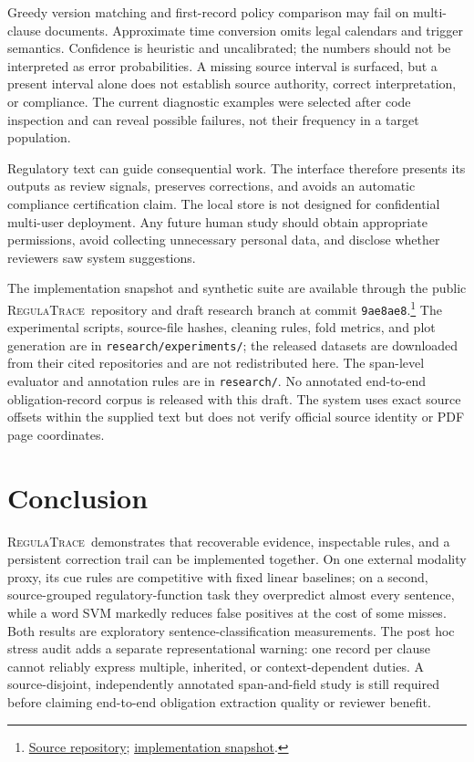 \documentclass[11pt,a4paper]{article}
\newcommand{\system}{\textsc{RegulaTrace}}
\newcommand{\field}[1]{\texttt{#1}}
\begin{document}
Greedy version matching and first-record policy comparison may fail on multi-clause documents. Approximate time conversion omits legal calendars and trigger semantics. Confidence is heuristic and uncalibrated; the numbers should not be interpreted as error probabilities. A missing source interval is surfaced, but a present interval alone does not establish source authority, correct interpretation, or compliance. The current diagnostic examples were selected after code inspection and can reveal possible failures, not their frequency in a target population.

Regulatory text can guide consequential work. The interface therefore presents its outputs as review signals, preserves corrections, and avoids an automatic compliance certification claim. The local store is not designed for confidential multi-user deployment. Any future human study should obtain appropriate permissions, avoid collecting unnecessary personal data, and disclose whether reviewers saw system suggestions.

The implementation snapshot and synthetic suite are available through the public \system\ repository and draft research branch at commit \field{9ae8ae8}.\footnote{\href{https://github.com/trayee05/regulatrace-compliance-intelligence}{Source repository}; \href{https://github.com/lakshitsachdeva/regulatrace-compliance-intelligence/commit/9ae8ae87a1890363690a37d448dd5f7cc18c9e3b}{implementation snapshot}.} The experimental scripts, source-file hashes, cleaning rules, fold metrics, and plot generation are in \field{research/experiments/}; the released datasets are downloaded from their cited repositories and are not redistributed here. The span-level evaluator and annotation rules are in \field{research/}. No annotated end-to-end obligation-record corpus is released with this draft. The system uses exact source offsets within the supplied text but does not verify official source identity or PDF page coordinates.

\section{Conclusion}
\system\ demonstrates that recoverable evidence, inspectable rules, and a persistent correction trail can be implemented together. On one external modality proxy, its cue rules are competitive with fixed linear baselines; on a second, source-grouped regulatory-function task they overpredict almost every sentence, while a word SVM markedly reduces false positives at the cost of some misses. Both results are exploratory sentence-classification measurements. The post hoc stress audit adds a separate representational warning: one record per clause cannot reliably express multiple, inherited, or context-dependent duties. A source-disjoint, independently annotated span-and-field study is still required before claiming end-to-end obligation extraction quality or reviewer benefit.
\end{document}
